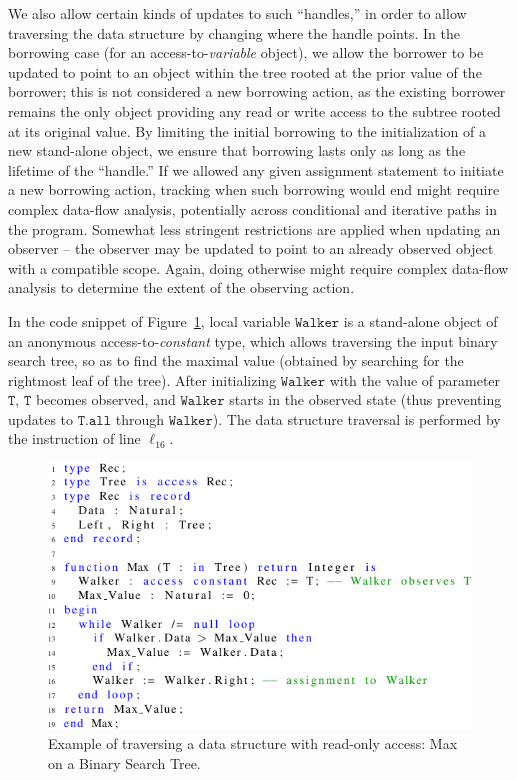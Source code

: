 \documentclass[runningheads]{llncs}
\newcommand\var[1]{\ensuremath{\mathtt{#1}}}
\begin{document}
We also allow certain kinds of updates to such ``handles,'' in order to allow traversing the data structure by changing where the handle points.
In the borrowing case (for an access-to-\textit{variable} object), we allow the borrower to be updated to point to an object within the tree rooted at the prior value of the borrower; this is not considered a new borrowing action, as the existing borrower remains the only object providing any read or write access to the subtree rooted at its original value.
By limiting the initial borrowing to the initialization of a new stand-alone object, we ensure that borrowing lasts only as long as the lifetime of the ``handle.''  If we allowed any given assignment statement to initiate a new borrowing action, tracking when such borrowing would end might require complex data-flow analysis, potentially across conditional and iterative paths in the program.  Somewhat less stringent restrictions are applied when updating an observer -- the observer may be updated to point to an already observed object with a compatible scope. Again, doing otherwise might require complex data-flow analysis to determine the extent of the observing action.

In the code snippet of Figure~\ref{fig:maxTree}, local variable \var{Walker} is a stand-alone object of an anonymous access-to-\textit{constant} type, which allows traversing the input binary
search tree, so as to find the maximal value (obtained by searching for the rightmost leaf of the tree). After initializing \var{Walker} with the value of parameter \var{T},
\var{T} becomes observed, and \var{Walker} starts in the observed state (thus preventing updates to \var{T.all} through \var{Walker}). The data structure traversal is performed by the instruction
of line $\ell_{16}$.

\begin{figure}[htb!]
\centering
  \captionsetup{justification=centering,margin=0.6cm}
   \includegraphics[]{maxTree}
   \caption{Example of traversing a data structure with read-only access: Max on a Binary Search Tree.}
   \label{fig:maxTree}
\end{figure}
\end{document}
